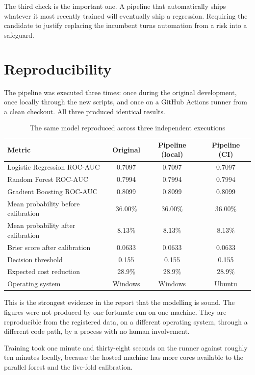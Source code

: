 \documentclass[11pt,a4paper]{report}
\begin{document}
The third check is the important one. A pipeline that automatically ships
whatever it most recently trained will eventually ship a regression. Requiring
the candidate to justify replacing the incumbent turns automation from a risk
into a safeguard.

\section{Reproducibility}

The pipeline was executed three times: once during the original development,
once locally through the new scripts, and once on a GitHub Actions runner from a
clean checkout. All three produced identical results.

\begin{table}[H]
\centering
\caption{The same model reproduced across three independent executions}
\begin{tabular}{@{}lccc@{}}
\toprule
\textbf{Metric} & \textbf{Original} & \textbf{Pipeline (local)} &
\textbf{Pipeline (CI)} \\
\midrule
Logistic Regression ROC-AUC & 0.7097 & 0.7097 & 0.7097 \\
Random Forest ROC-AUC & 0.7994 & 0.7994 & 0.7994 \\
Gradient Boosting ROC-AUC & 0.8099 & 0.8099 & 0.8099 \\
Mean probability before calibration & 36.00\% & 36.00\% & 36.00\% \\
Mean probability after calibration & 8.13\% & 8.13\% & 8.13\% \\
Brier score after calibration & 0.0633 & 0.0633 & 0.0633 \\
Decision threshold & 0.155 & 0.155 & 0.155 \\
Expected cost reduction & 28.9\% & 28.9\% & 28.9\% \\
\midrule
Operating system & Windows & Windows & Ubuntu \\
\bottomrule
\end{tabular}
\end{table}

This is the strongest evidence in the report that the modelling is sound. The
figures were not produced by one fortunate run on one machine. They are
reproducible from the registered data, on a different operating system, through
a different code path, by a process with no human involvement.

Training took one minute and thirty-eight seconds on the runner against roughly
ten minutes locally, because the hosted machine has more cores available to the
parallel forest and the five-fold calibration.
\end{document}
